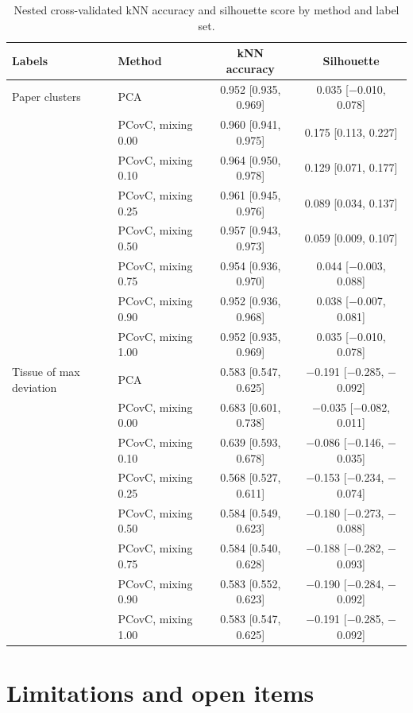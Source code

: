 \documentclass[11pt]{article}
\begin{document}
\begin{table}[H]
\centering
\caption{Nested cross-validated kNN accuracy and silhouette score by method and label set.}
\label{tab:ncv}
\small
\begin{tabular}{llcc}
\toprule
Labels & Method & kNN accuracy & Silhouette \\
\midrule
Paper clusters & PCA & 0.952 [0.935, 0.969] & 0.035 [$-$0.010, 0.078] \\
 & PCovC, mixing 0.00 & 0.960 [0.941, 0.975] & 0.175 [0.113, 0.227] \\
 & PCovC, mixing 0.10 & 0.964 [0.950, 0.978] & 0.129 [0.071, 0.177] \\
 & PCovC, mixing 0.25 & 0.961 [0.945, 0.976] & 0.089 [0.034, 0.137] \\
 & PCovC, mixing 0.50 & 0.957 [0.943, 0.973] & 0.059 [0.009, 0.107] \\
 & PCovC, mixing 0.75 & 0.954 [0.936, 0.970] & 0.044 [$-$0.003, 0.088] \\
 & PCovC, mixing 0.90 & 0.952 [0.936, 0.968] & 0.038 [$-$0.007, 0.081] \\
 & PCovC, mixing 1.00 & 0.952 [0.935, 0.969] & 0.035 [$-$0.010, 0.078] \\
\midrule
Tissue of max deviation & PCA & 0.583 [0.547, 0.625] & $-$0.191 [$-$0.285, $-$0.092] \\
 & PCovC, mixing 0.00 & 0.683 [0.601, 0.738] & $-$0.035 [$-$0.082, 0.011] \\
 & PCovC, mixing 0.10 & 0.639 [0.593, 0.678] & $-$0.086 [$-$0.146, $-$0.035] \\
 & PCovC, mixing 0.25 & 0.568 [0.527, 0.611] & $-$0.153 [$-$0.234, $-$0.074] \\
 & PCovC, mixing 0.50 & 0.584 [0.549, 0.623] & $-$0.180 [$-$0.273, $-$0.088] \\
 & PCovC, mixing 0.75 & 0.584 [0.540, 0.628] & $-$0.188 [$-$0.282, $-$0.093] \\
 & PCovC, mixing 0.90 & 0.583 [0.552, 0.623] & $-$0.190 [$-$0.284, $-$0.092] \\
 & PCovC, mixing 1.00 & 0.583 [0.547, 0.625] & $-$0.191 [$-$0.285, $-$0.092] \\
\bottomrule
\end{tabular}
\end{table}

\section{Limitations and open items}
\label{sec:limits}
\end{document}
